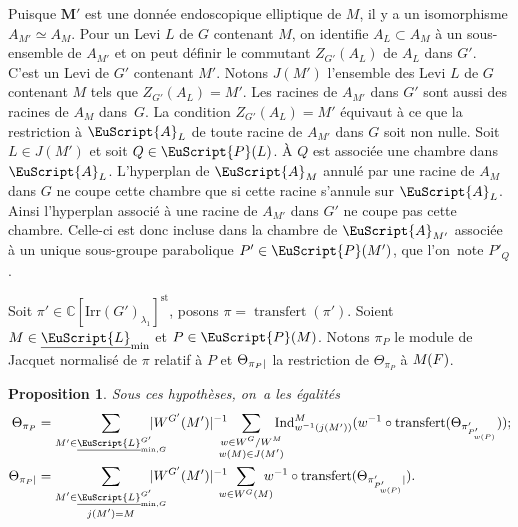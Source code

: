 \documentclass[JEP,XML,SOM,Unicode,francais]{cedram}
\let\mathcal \EuScript
\newcommand{\NoChangel}[1]{%
\expandafter\let\csname old\string#1\endcsname=#1
\let#1=\relax
\newcommand{#1}{\mathcode`l="716C\csname old\string#1\endcsname\mathcode`l="7160 }%
}
\newcommand{\rell}{\mathrm{ell}} \NoChangel{\rell}
\newcommand{\Ind}{\mathrm{Ind}}
\newcommand{\Irr}{\mathrm{Irr}}
\newcommand{\trel}{\textup{-rel}} \NoChangel{\trel}
\newcommand{\st}{\mathrm{st}}
\DeclareMathOperator{\transfert}{transfert}
\newcommand{\bM}{\boldsymbol{M}}
\newcommand{\cA}{\mathcal{A}}
\newcommand{\cL}{\mathcal{L}}
\newcommand{\cP}{\mathcal{P}}
\newcommand{\CC}{\mathbb{C}}
\theoremstyle{plain}
\newtheorem*{prop*}{Proposition}
\theoremstyle{definition}
\begin{document}
Puisque $\bM'$ est une donnée endoscopique elliptique de $M$, il y a un isomorphisme $A_{M'}\simeq A_{M}$. Pour un Levi $L$ de $G$ contenant $M$, on identifie $A_{L}\subset A_{M}$ à un sous-ensemble de $A_{M'}$ et on peut définir le commutant $Z_{G'}(A_{L})$ de $A_{L}$ dans $G'$. C'est un Levi de $G'$ contenant $M'$. Notons $J(M')$ l'ensemble des Levi $L$ de $G$ contenant $M$ tels que $Z_{G'}(A_{L})=M'$.
Les racines de $A_{M'}$ dans $G'$ sont aussi des racines de $A_{M}$ dans~$G$. La condition $Z_{G'}(A_{L})=M'$ équivaut à ce que la restriction à $\cA_{L}$ de toute racine de $A_{M'}$ dans $G$ soit non nulle. Soit $L\in J(M')$ et soit $Q\in \cP(L)$. À $Q$ est associée une chambre dans $\cA_{L}$. L'hyperplan de $\cA_{M}$ annulé par une racine de $A_{M}$ dans $G$ ne coupe cette chambre que si cette racine s'annule sur $\cA_{L}$. Ainsi l'hyperplan associé à une racine de $A_{M'}$ dans $G'$ ne coupe pas cette chambre. Celle-ci est donc incluse dans la chambre de $\cA_{M'}$ associée à un unique sous-groupe parabolique $P'\in \cP(M')$, que l'on~note $P'_{Q}$.

Soit $\pi'\in \CC[ \Irr(G')_{\lambda_{1}}]^{\st}$, posons $\pi=\transfert(\pi')$. Soient $M\in \underline{\cL}_{\min}$ et
$P\in \cP(M)$. Notons $\pi_{P}$ le module de Jacquet normalisé de $\pi$ relatif à $P$ et $ \Theta_{\pi_{P}\vert\rell}$ la restriction de $\Theta_{\pi_{P}}$ à $M_{\rell}(F)$.

\begin{prop*}
Sous ces hypothèses, on~a les égalités
\begin{align*}
\Theta_{\pi_{P}}&=\sum_{M'\in \underline{\cL}_{\min, G\trel}^{G'}}\hspace*{-5mm}\vert W^{G'}(M')\vert ^{-1}\hspace*{-3mm}\sum_{\substack{w\in W^G/W^M\\w(M)\in J(M')}}\hspace*{-3mm}\Ind_{w^{-1}(j(M'))}^M(w^{-1}\circ \transfert(\Theta_{\pi'_{P'_{w(P)}}}));\\
\Theta_{\pi_{P}\vert\rell}&=\sum_{\substack{M'\in \underline{\cL}_{\min,G\trel}^{G'}\\ j(M')= M}}\hspace*{-5mm}\vert W^{G'}(M')\vert ^{-1}\hspace*{-3mm}\sum_{w\in W^{G}(M)}\hspace*{-3mm}w^{-1}\circ \transfert(\Theta_{\pi'_{P'_{w(P)}}\vert\rell}).
\end{align*}
\end{prop*}
\end{document}

